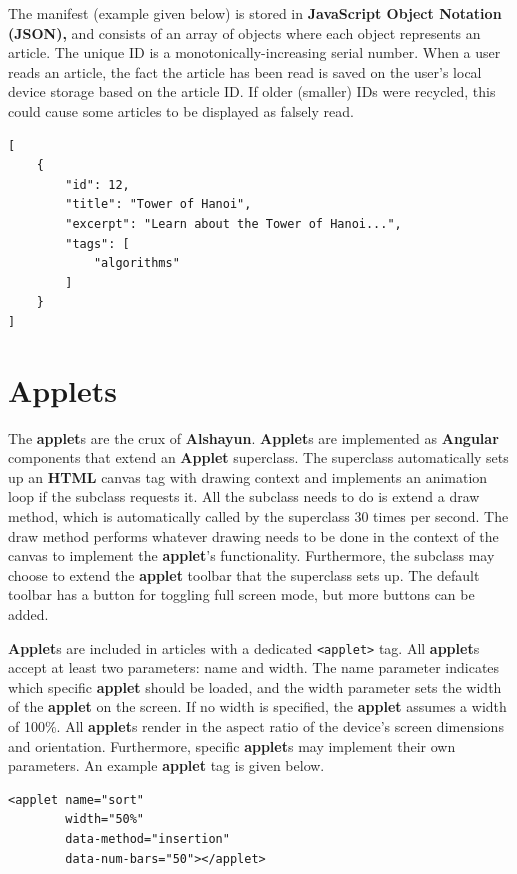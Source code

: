 \documentclass[12pt]{report}
\begin{document}
The manifest (example given below) is stored in \textbf{JavaScript Object
Notation (JSON),} and consists of an array of objects where each object
represents an article. The unique ID is a monotonically-increasing serial
number. When a user reads an article, the fact the article has been read is
saved on the user's local device storage based on the article ID. If older
(smaller) IDs were recycled, this could cause some articles to be displayed as
falsely read.

\begin{verbatim}
[
    {
        "id": 12,
        "title": "Tower of Hanoi",
        "excerpt": "Learn about the Tower of Hanoi...",
        "tags": [
            "algorithms"
        ]
    }
]
\end{verbatim}

    \section{Applets}

The \textbf{applet}s are the crux of \textbf{Alshayun}. \textbf{Applet}s are
implemented as \textbf{Angular} components that extend an \textbf{Applet}
superclass. The superclass automatically sets up an \textbf{HTML} canvas tag
with drawing context and implements an animation loop if the subclass requests
it. All the subclass needs to do is extend a draw method, which is automatically
called by the superclass 30 times per second. The draw method performs whatever
drawing needs to be done in the context of the canvas to implement the
\textbf{applet}'s functionality. Furthermore, the subclass may choose to extend
the \textbf{applet} toolbar that the superclass sets up. The default toolbar has
a button for toggling full screen mode, but more buttons can be added.

\textbf{Applet}s are included in articles with a dedicated \texttt{<applet>}
tag. All \textbf{applet}s accept at least two parameters: name and width. The
name parameter indicates which specific \textbf{applet} should be loaded, and
the width parameter sets the width of the \textbf{applet} on the screen. If no
width is specified, the \textbf{applet} assumes a width of 100\%. All
\textbf{applet}s render in the aspect ratio of the device's screen dimensions
and orientation. Furthermore, specific \textbf{applet}s may implement their own
parameters. An example \textbf{applet} tag is given below.

\begin{verbatim}
<applet name="sort"
        width="50%"
        data-method="insertion"
        data-num-bars="50"></applet>
\end{verbatim}
\end{document}
